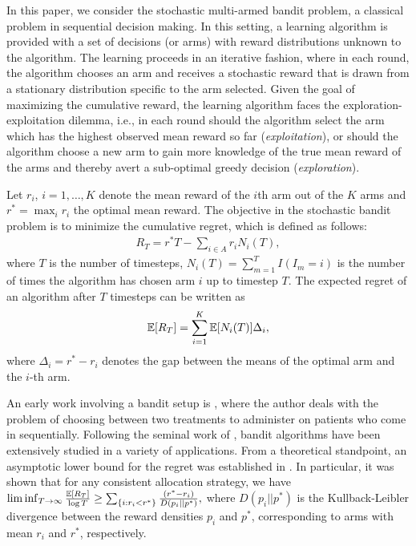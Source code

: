 In this paper, we consider the stochastic multi-armed bandit problem, a classical problem in sequential decision making. In this setting,  a learning algorithm is provided with a set of decisions (or arms) with reward distributions unknown to the algorithm. The learning proceeds in an iterative fashion, where in each round, the algorithm chooses an arm and receives a stochastic reward that is drawn from a stationary distribution specific to the arm selected.  
Given the goal of maximizing the cumulative reward, the learning algorithm faces the exploration-exploitation dilemma, i.e., in each round should the algorithm select the arm which has the highest observed mean reward so far 
(\textit{exploitation}), or should the algorithm choose a new arm to gain more knowledge of the true mean reward of the arms and thereby avert a sub-optimal greedy decision (\textit{exploration}). 

Let $r_i$, $i=1,\ldots,K$ denote the mean reward of the $i$th arm out of the $K$ arms and $r^* = \max_i r_i$ the optimal mean reward. The objective in the stochastic bandit problem is to minimize the cumulative regret, which is defined as follows:
\begin{align*}
R_{T}=r^{*}T - \sum_{i\in A} r_{i}N_{i}(T),
\end{align*}
where $T$ is the number of timesteps, $N_{i}(T)=\sum_{m=1}^T I(I_m=i)$ is the number of times the algorithm has chosen arm $i$ up to timestep $T$.
The expected regret of an algorithm after $T$ timesteps can be written as
\begin{align*}
\mathbb{E}[R_{T}]= \sum_{i=1}^K \mathbb{E}[N_i(T)] \Delta_i,
\end{align*}
where $\Delta_{i}=r^{*}-r_{i}$ denotes the gap between the means of the optimal arm and the $i$-th arm. 


                                                                                                                                          


An early work involving a bandit setup is \cite{thompson1933likelihood}, where the author deals with  the problem of choosing between two treatments to administer on patients who come in sequentially. Following the seminal work of \cite{robbins1952some}, bandit algorithms have been extensively studied in a variety of applications. 
From a theoretical standpoint, an asymptotic lower bound for the regret was established in \cite{lai1985asymptotically}. In particular, it was shown that for any consistent allocation strategy, we have
$\liminf_{T \to \infty}\frac{\mathbb{E}[R_{T}]}{\log T}\geq\sum_{\{i:r_{i}<r^{*}\}}\frac{(r^{*}-r_{i})}{D(p_{i}||p^{*})},$
where $D(p_{i}||p^{*})$ is the Kullback-Leibler divergence between the reward densities $p_{i}$ and $p^{*}$, corresponding to arms with mean $r_{i}$ and $r^{*}$, respectively.


